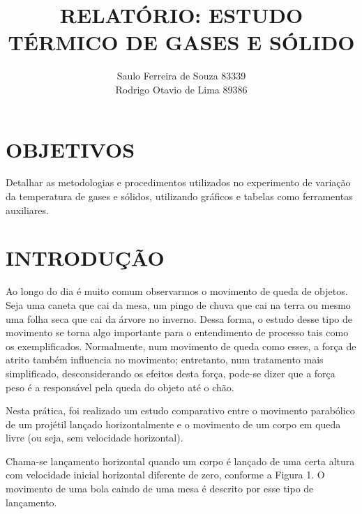 \documentclass[10pt]{article}
\begin{document}
	

\title{\uppercase{\textbf{Relatório: Estudo térmico de gases e sólido}}}
\author{Saulo Ferreira de Souza 83339 \protect\\ Rodrigo Otavio de Lima 89386}
\maketitle

\setlength{\parindent}{2cm}

\section{OBJETIVOS}

Detalhar as metodologias e procedimentos utilizados no experimento de variação da temperatura de gases e sólidos, utilizando gráficos e tabelas como ferramentas auxiliares.


\section{INTRODUÇÃO}

Ao longo do dia é muito comum observarmos o movimento de queda de objetos. Seja uma caneta que cai da mesa, um pingo de chuva que cai na terra ou mesmo uma folha seca que cai da árvore no inverno. Dessa forma, o estudo desse tipo de movimento se torna algo importante para o  entendimento  de  processo tais  como os  exemplificados.  Normalmente,  num  movimento  de queda  como  esses,  a  força  de  atrito  também  influencia  no  movimento;  entretanto,  num  tratamento mais simplificado, desconsiderando os efeitos desta força, pode-se dizer que a força peso é a responsável pela queda do objeto até o chão. 

Nesta prática, foi realizado um estudo comparativo entre o movimento parabólico de um projétil lançado  horizontalmente  e o movimento de  um corpo em queda livre  (ou seja, sem velocidade horizontal).

Chama-se lançamento horizontal quando um corpo é lançado de uma certa altura com velocidade inicial horizontal diferente de  zero, conforme  a  Figura 1. O  movimento de  uma  bola  caindo de 
uma mesa é descrito por esse tipo de lançamento.
\end{document}
